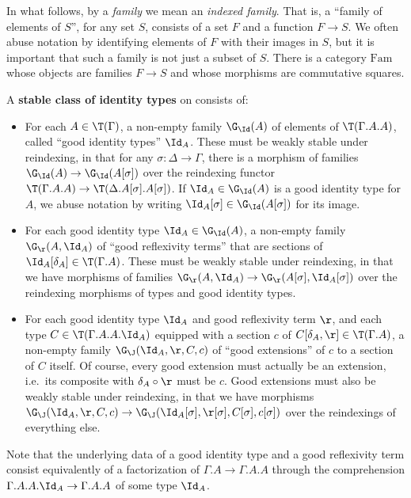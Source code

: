 In what follows, by a \emph{family} we mean an \emph{indexed family}.
That is, a ``family of elements of $S$'', for any set $S$, consists of a set $F$ and a function $F\to S$.
We often abuse notation by identifying elements of $F$ with their images in $S$, but it is important that such a family is not just a subset of $S$.
There is a category $\mathrm{Fam}$ whose objects are families $F\to S$ and whose morphisms are commutative squares.

\begin{defn}\label{defn:id}
  A \textbf{stable class of identity types} on \C consists of:
  \begin{itemize}
  \item For each $A\in \T(\Gamma)$, a non-empty family $\G_\Id(A)$ of elements of $\T(\Gamma.A.A)$, called ``good identity types'' $\Id_A$.
    These must be weakly stable under reindexing, in that for any $\sigma:\Delta\to\Gamma$, there is a morphism of families $\G_\Id(A) \to \G_\Id(A[\sigma])$ over the reindexing functor $\T(\Gamma.A.A) \to \T(\Delta.A[\sigma].A[\sigma])$.
    If $\Id_A\in\G_\Id(A)$ is a good identity type for $A$, we abuse notation by writing $\Id_A[\sigma] \in \G_\Id(A[\sigma])$ for its image.
  \item For each good identity type $\Id_A\in\G_\Id(A)$, a non-empty family $\G_\r(A,\Id_A)$ of ``good reflexivity terms'' that are sections of $\Id_A[\delta_A] \in \T(\Gamma.A)$.
    These must be weakly stable under reindexing, in that we have morphisms of families $\G_\r(A,\Id_A) \to \G_\r(A[\sigma],\Id_A[\sigma])$ over the reindexing morphisms of types and good identity types.
  \item For each good identity type $\Id_A$ and good reflexivity term $\r$, and each type $C\in\T(\Gamma.A.A.\Id_A)$ equipped with a section $c$ of $C[\delta_A,\r]\in\T(\Gamma.A)$, a non-empty family $\G_\J(\Id_A,\r,C,c)$ of ``good extensions'' of $c$ to a section of $C$ itself.
    Of course, every good extension must actually be an extension, i.e.\ its composite with $\delta_A \circ \r$ must be $c$.
    Good extensions must also be weakly stable under reindexing, in that we have morphisms $\G_\J(\Id_A,\r,C,c) \to \G_\J(\Id_A[\sigma],\r[\sigma],C[\sigma],c[\sigma])$ over the reindexings of everything else.
  \end{itemize}
\end{defn}

Note that the underlying data of a good identity type and a good reflexivity term consist equivalently of a factorization of $\Gamma.A \to \Gamma.A.A$ through the comprehension $\Gamma.A.A.\Id_A \to \Gamma.A.A$ of some type $\Id_A$.

